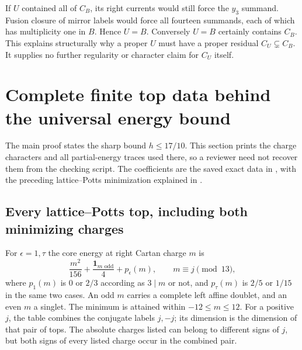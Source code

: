 If $U$ contained all of $C_B$, its right currents would still
force the $y_3$ summand. Fusion closure of mirror labels would
force all fourteen summands, each of which has multiplicity one
in $B$. Hence $U=B$. Conversely $U=B$ certainly contains $C_B$.
This explains structurally why a proper $U$ must have a proper
residual $C_U\subsetneq C_B$. It supplies no further regularity
or character claim for $C_U$ itself.

\section{Complete finite top data behind the universal energy bound}
\label{expstructure:tops}

The main proof states the sharp bound $h\le17/10$. This section
prints the charge characters and all partial-energy traces used
there, so a reviewer need not recover them from the checking script.
The coefficients are the saved exact data in
,
with the preceding lattice--Potts minimization explained in
.

\subsection{Every lattice--Potts top, including both minimizing charges}

For $\epsilon=1,\tau$ the core energy at right Cartan charge $m$ is
\[
 \frac{m^2}{156}+\frac{\mathbf1_{m\text{ odd}}}{4}
                  +p_\epsilon(m),
 \qquad m\equiv j\pmod{13},
\]
where $p_1(m)$ is $0$ or $2/3$ according as $3\mid m$ or not,
and $p_\tau(m)$ is $2/5$ or $1/15$ in the same two cases.
An odd $m$ carries a complete left affine doublet, and an even
$m$ a singlet. The minimum is attained within $-12\le m\le12$.
For a positive $j$, the table combines the conjugate labels $j,-j$;
its dimension is the dimension of that pair of tops. The absolute
charges listed can belong to different signs of $j$, but both
signs of every listed charge occur in the combined pair.

